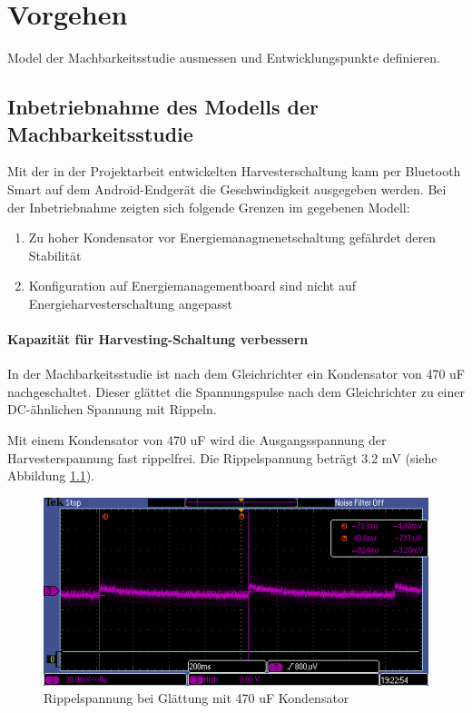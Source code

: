 \chapter{Vorgehen}
Model der Machbarkeitsstudie ausmessen und Entwicklungspunkte definieren.

\section{Inbetriebnahme des Modells der Machbarkeitsstudie}
Mit der in der Projektarbeit entwickelten Harvesterschaltung kann per Bluetooth Smart auf dem Android-Endgerät die Geschwindigkeit ausgegeben werden.
Bei der Inbetriebnahme zeigten sich folgende Grenzen im gegebenen Modell:

\begin{enumerate}
    \item Zu hoher Kondensator vor Energiemanagmenetschaltung gefährdet deren Stabilität
    \item Konfiguration auf Energiemanagementboard sind nicht auf Energieharvesterschaltung angepasst
\end{enumerate}



\subsubsection{Kapazität für Harvesting-Schaltung verbessern}
In der Machbarkeitsstudie ist nach dem Gleichrichter ein Kondensator von 470 uF nachgeschaltet. Dieser glättet die Spannungspulse nach dem Gleichrichter zu einer DC-ähnlichen Spannung mit Rippeln.

Mit einem Kondensator von 470 uF wird die Ausgangsspannung der Harvesterspannung fast rippelfrei. Die Rippelspannung beträgt 3.2 mV (siehe Abbildung \ref{kond470uF}).
\begin{figure}
    \includegraphics[bb = 0 0 100 100]{3Vorgehen/imag/470uF.PNG}
    \caption{Rippelspannung bei Glättung mit 470 uF Kondensator}\label{kond470uF} 
\end{figure}

